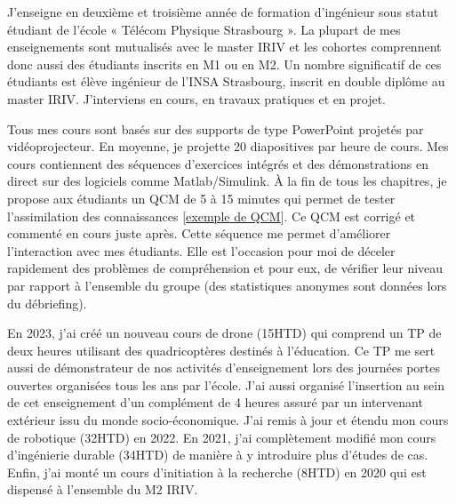 \documentclass[a4paper,12pt]{article}
\begin{document}

J’enseigne en deuxième et troisième année de formation d’ingénieur sous statut
étudiant de l’école « Télécom Physique Strasbourg ». La plupart de mes
enseignements sont mutualisés avec le master IRIV et les cohortes comprennent donc aussi des étudiants inscrits en M1 ou en M2. Un nombre significatif de ces étudiants est élève ingénieur de l’INSA Strasbourg, inscrit en double diplôme au master IRIV. J’interviens en cours, en travaux pratiques et en projet.

Tous mes cours sont basés sur des supports de type PowerPoint projetés par vidéoprojecteur. En moyenne, je projette 20 diapositives par heure de cours. Mes cours contiennent des séquences d’exercices intégrés et des démonstrations en direct sur des logiciels comme Matlab/Simulink. À la fin de tous les chapitres, je propose aux étudiants un QCM de 5 à 15 minutes qui permet de tester l’assimilation des connaissances [\href{https://docs.google.com/forms/d/18JizlS3drjelkc4IQsd0PguedCdYTxuA80YoaMUxwCc}{exemple de QCM}]. Ce QCM est corrigé et commenté en cours juste après. Cette séquence me permet d’améliorer l’interaction avec mes
étudiants. Elle est l’occasion pour moi de déceler rapidement des problèmes de compréhension et pour eux, de vérifier leur niveau par rapport à l’ensemble du groupe (des statistiques anonymes sont données lors du débriefing).

En 2023, j’ai créé un nouveau cours de drone (15HTD) qui comprend un TP de deux heures utilisant des quadricoptères destinés à l’éducation. Ce TP me sert aussi de démonstrateur de nos activités d'enseignement lors des journées portes ouvertes organisées tous les ans par l'école. J’ai aussi organisé l’insertion au sein de cet enseignement d’un complément de 4 heures assuré par un intervenant extérieur issu du monde socio-économique. J’ai remis à jour et étendu mon cours de robotique (32HTD) en 2022. En 2021, j’ai complètement modifié mon cours d’ingénierie durable (34HTD) de manière à y introduire plus d’études de cas. Enfin, j’ai monté un cours d’initiation à la recherche (8HTD) en 2020 qui est dispensé à l’ensemble du M2 IRIV.
\end{document}
